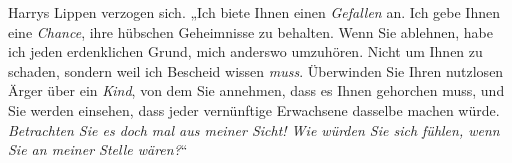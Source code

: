 Harrys Lippen verzogen sich. „Ich biete Ihnen einen \emph{Gefallen} an. Ich gebe Ihnen eine \emph{Chance}, ihre hübschen Geheimnisse zu behalten. Wenn Sie ablehnen, habe ich jeden erdenklichen Grund, mich anderswo umzuhören. Nicht um Ihnen zu schaden, sondern weil ich Bescheid wissen \emph{muss}. Überwinden Sie Ihren nutzlosen Ärger über ein \emph{Kind}, von dem Sie annehmen, dass es Ihnen gehorchen muss, und Sie werden einsehen, dass jeder vernünftige Erwachsene dasselbe machen würde. \emph{Betrachten Sie es doch mal aus meiner Sicht! Wie würden Sie sich fühlen, wenn Sie an meiner Stelle wären?}“

